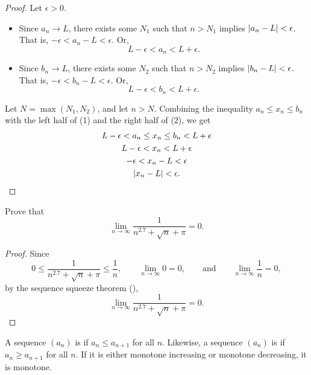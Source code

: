 \documentclass[11pt,twoside=off,numbers=noenddot]{scrbook}
\begin{document}
\begin{proof}
  Let $\epsilon > 0$.
  \begin{itemize}
    \item Since $a_n \to L$, there exists some $N_1$ such that $n >
      N_1$ implies $| a_n - L | < \epsilon$. That is, $-\epsilon <
      a_n - L < \epsilon$. Or,
      \[ L - \epsilon < a_n < L + \epsilon. \tag{1} \]

    \item Since $b_n \to L$, there exists some $N_2$ such that $n >
      N_2$ implies $| b_n - L | < \epsilon$. That is, $-\epsilon <
      b_n - L < \epsilon$. Or,
      \[ L - \epsilon < b_n < L + \epsilon. \tag{2} \]
  \end{itemize}

  Let $N = \max(N_1, N_2)$, and let $n > N$. Combining the
  inequality $a_n \leq x_n \leq b_n$ with the left half of (1) and
  the right half of (2), we get
  \begin{gather*}
    L - \epsilon < a_n \leq x_n \leq b_n < L + \epsilon \\
    L - \epsilon < x_n < L + \epsilon \\
    -\epsilon < x_n - L < \epsilon \\
    | x_n - L | < \epsilon.
  \end{gather*}
  \vspace{-1em}
\end{proof}

\begin{example}
  Prove that
  \[ \lim_{n \to \infty} \frac{1}{n^{2.7} + \sqrt{n} + \pi} = 0. \]

  \begin{proof}
    Since
    \[ 0 \leq \frac{1}{n^{2.7} + \sqrt{n} + \pi} \leq \frac{1}{n},
      \qquad \lim_{n \to \infty} 0 = 0, \qquad \text{and} \qquad \lim_{n
    \to \infty} \frac{1}{n} = 0, \]
    by the sequence squeeze theorem (),
    \[ \lim_{n \to \infty} \frac{1}{n^{2.7} + \sqrt{n} + \pi} = 0. \]
  \end{proof}
\end{example}

\begin{definition}
  A sequence $(a_n)$ is  if $a_n \leq a_{n
  + 1}$ for all $n$. Likewise, a sequence $(a_n)$ is  if $a_n \geq a_{n + 1}$ for all $n$. If it is either
  monotone increasing or monotone decreasing, it is monotone.
\end{definition}
\end{document}
